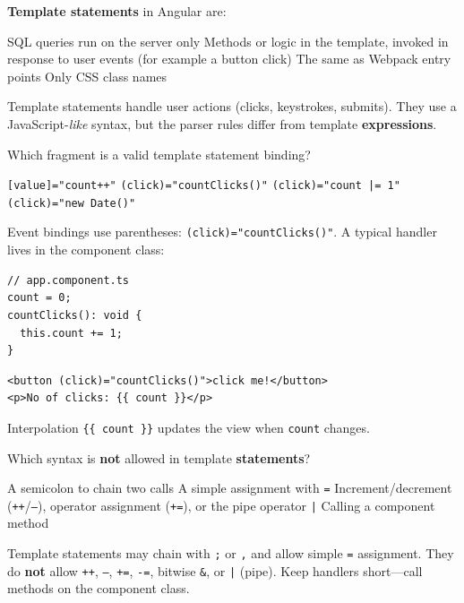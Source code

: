 \question[4]
\textbf{Template statements} in Angular are:
\begin{choices}
  \choice SQL queries run on the server only
  \CorrectChoice Methods or logic in the template, invoked in response to user events (for example a button click)
  \choice The same as Webpack entry points
  \choice Only CSS class names
\end{choices}
\begin{solution}
  Template statements handle user actions (clicks, keystrokes, submits). They use a JavaScript-\emph{like} syntax, but the parser rules differ from template \textbf{expressions}.
\end{solution}

\question[4]
Which fragment is a valid template statement binding?
\begin{choices}
  \choice \texttt{[value]="count++"}
  \CorrectChoice \texttt{(click)="countClicks()"}
  \choice \texttt{(click)="count |= 1"}
  \choice \texttt{(click)="new Date()"}
\end{choices}
\begin{solution}
  Event bindings use parentheses: \lstinline[style=tsinline]{(click)="countClicks()"}. A typical handler lives in the component class:
\begin{lstlisting}[style=ts]
// app.component.ts
count = 0;
countClicks(): void {
  this.count += 1;
}
\end{lstlisting}
\begin{lstlisting}[style=htmlinline]
<button (click)="countClicks()">click me!</button>
<p>No of clicks: {{ count }}</p>
\end{lstlisting}
  Interpolation \lstinline[style=htmlinline]|{{ count }}| updates the view when \texttt{count} changes.
\end{solution}

\question[4]
Which syntax is \textbf{not} allowed in template \textbf{statements}?
\begin{choices}
  \choice A semicolon to chain two calls
  \choice A simple assignment with \texttt{=}
  \CorrectChoice Increment/decrement (\texttt{++}/\texttt{--}), operator assignment (\texttt{+=}), or the pipe operator \texttt{|}
  \choice Calling a component method
\end{choices}
\begin{solution}
  Template statements may chain with \texttt{;} or \texttt{,} and allow simple \texttt{=} assignment. They do \textbf{not} allow \texttt{++}, \texttt{--}, \texttt{+=}, \texttt{-=}, bitwise \texttt{\&}, or \texttt{|} (pipe). Keep handlers short---call methods on the component class.
\end{solution}

